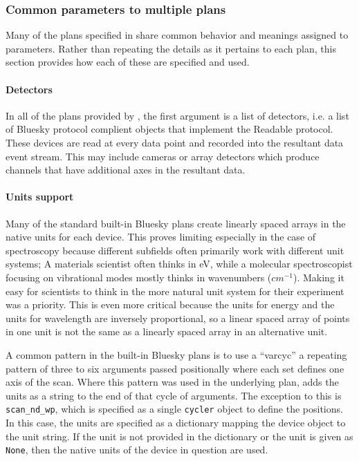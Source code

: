 \subsubsection{Common parameters to multiple plans}
\label{common_params}

Many of the plans specified in \wrightplans share common behavior and meanings assigned to parameters.
Rather than repeating the details as it pertains to each plan, this section provides how each of these are specified and used.

\paragraph{Detectors}

In all of the plans provided by \wrightplans, the first argument is a list of detectors, i.e. a list of Bluesky protocol complient objects that implement the Readable protocol.
These devices are read at every data point and recorded into the resultant data event stream.
This may include cameras or array detectors which produce channels that have additional axes in the resultant data.

\paragraph{Units support}

Many of the standard built-in Bluesky plans create linearly spaced arrays in the native units for each device.
This proves limiting especially in the case of spectroscopy because different subfields often primarily work with different unit systems; A materials scientist often thinks in eV, while a molecular spectroscopist focusing on vibrational modes mostly thinks in wavenumbers ($cm^{-1}$).
Making it easy for scientists to think in the more natural unit system for their experiment was a priority.
This is even more critical because the units for energy and the units for wavelength are inversely proportional, so a linear spaced array of points in one unit is not the same as a linearly spaced array in an alternative unit.



A common pattern in the built-in Bluesky plans is to use a ``\gls{varcyc}'' a repeating pattern of three to six arguments passed positionally where each set defines one axis of the scan.
Where this pattern was used in the underlying plan, \wrightplans adds the units as a string to the end of that cycle of arguments.
The exception to this is \texttt{scan\_nd\_wp}, which is specified as a single \texttt{cycler}\cite{} object to define the positions.
In this case, the units are specified as a dictionary mapping the device object to the unit string.
If the unit is not provided in the dictionary or the unit is given as \texttt{None}, then the native units of the device in question are used.

